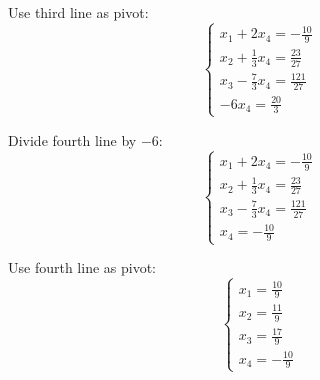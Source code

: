 \documentclass[A4paper]{article}
\begin{document}
Use third line as pivot:
\[
\begin{cases}
  x_1   +2x_4 = -\frac{10}{9}\\
  x_2  +\frac{1}{3}x_4 = \frac{23}{27}\\
   x_3 - \frac{7}{3}x_4 = \frac{121}{27}\\   
   -6x_4 = \frac{20}{3}
\end{cases}
\]

Divide fourth line by $-6$:
\[
\begin{cases}
  x_1   +2x_4 = -\frac{10}{9}\\
  x_2  +\frac{1}{3}x_4 = \frac{23}{27}\\
   x_3 - \frac{7}{3}x_4 = \frac{121}{27}\\   
   x_4 = -\frac{10}{9}
\end{cases}
\]

Use fourth line as pivot:
\[
\begin{cases}
  x_1   = \frac{10}{9}\\
  x_2   = \frac{11}{9}\\
   x_3  = \frac{17}{9}\\   
   x_4 = -\frac{10}{9}
\end{cases}
\]
\end{document}
